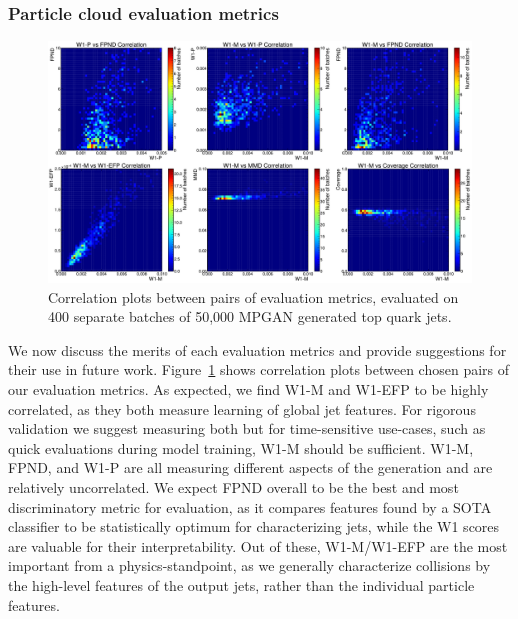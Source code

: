 \subsubsection{Particle cloud evaluation metrics}

\begin{figure}[htpb]
    \centering
    \centerline{
    \includegraphics[width=\textwidth]{figures/04-ML4Sim/mpgan/correlation_plots.pdf}}
    \caption{Correlation plots between pairs of evaluation metrics, evaluated on 400 separate batches of 50,000 MPGAN generated top quark jets.
    }
    \label{fig:04_mpgan_correlation}
\end{figure}

We now discuss the merits of each evaluation metrics and provide suggestions for their use in future work. Figure~\ref{fig:04_mpgan_correlation} shows correlation plots between chosen pairs of our evaluation metrics.
As expected, we find W1-M and W1-EFP to be highly correlated,  as they both measure learning of global jet features.
For rigorous validation we suggest measuring both but for time-sensitive use-cases, such as quick evaluations during model training, W1-M should be sufficient.
W1-M, FPND, and W1-P are all measuring different aspects of the generation and are relatively uncorrelated.
We expect FPND overall to be the best and most discriminatory metric for evaluation, as it compares features found by a SOTA classifier to be statistically optimum for characterizing jets, while the W1 scores are valuable for their interpretability.
Out of these, W1-M/W1-EFP are the most important from a physics-standpoint, as we generally characterize collisions by the high-level features of the output jets, rather than the individual particle features.

